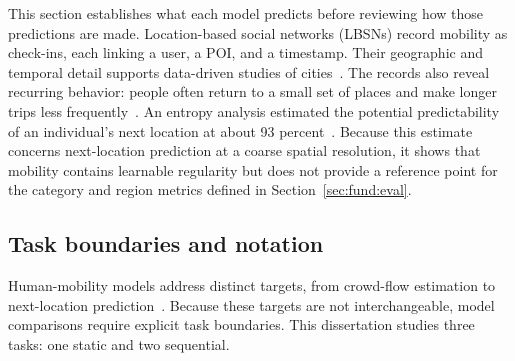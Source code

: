 This section establishes what each model predicts before reviewing how those
predictions are made. Location-based social networks (LBSNs) record mobility as
check-ins, each linking a user, a POI, and a timestamp. Their geographic and temporal
detail supports data-driven studies of cities~\cite{silva2019urbancomputing}. The
records also reveal recurring behavior: people often return to a small set of places
and make longer trips less frequently~\cite{cho2011gowalla}. An entropy analysis
estimated the potential predictability of an individual's next location at about 93
percent~\cite{song2010limits}. Because this estimate concerns next-location prediction
at a coarse spatial resolution, it shows that mobility contains learnable regularity
but does not provide a reference point for the category and region metrics defined in
Section~\ref{sec:fund:eval}.

\subsection{Task boundaries and notation}

Human-mobility models address distinct targets, from crowd-flow estimation to
next-location prediction~\cite{luca2021mobilitysurvey}. Because these targets are not
interchangeable, model comparisons require explicit task boundaries. This dissertation
studies three tasks: one static and two sequential.


